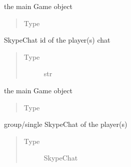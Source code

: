 \documentclass[letterpaper,10pt,english]{sphinxmanual}
\begin{document}
\begin{fulllineitems}
\begin{fulllineitems}
\end{fulllineitems}



\begin{fulllineitems}
the main Game object
\begin{quote}\begin{description}
\item[{Type}] \leavevmode
{\hyperref[\detokenize{chatwolf:chatwolf.game.Game}]{}}

\end{description}\end{quote}

\end{fulllineitems}



\begin{fulllineitems}
SkypeChat id of the player(s) chat
\begin{quote}\begin{description}
\item[{Type}] \leavevmode
str

\end{description}\end{quote}

\end{fulllineitems}



\begin{fulllineitems}
the main Game object
\begin{quote}\begin{description}
\item[{Type}] \leavevmode
{\hyperref[\detokenize{chatwolf:chatwolf.game.Game}]{}}

\end{description}\end{quote}

\end{fulllineitems}



\begin{fulllineitems}
group/single SkypeChat of the player(s)
\begin{quote}\begin{description}
\item[{Type}] \leavevmode
SkypeChat


\end{description}
\end{quote}
\end{fulllineitems}
\end{fulllineitems}
\end{document}
